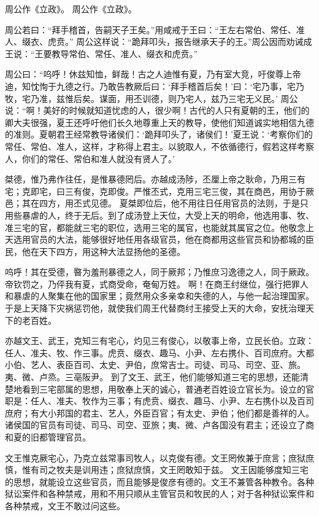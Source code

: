 \documentclass[a4paper,12pt,UTF8,twoside]{ctexbook}
\begin{document}
周公作《立政》。
周公作《立政》。

周公若曰：“拜手稽首，告嗣天子王矣。”用咸戒于王曰：“王左右常伯、常任、准人、缀衣、虎贲。”
周公这样说：“跪拜叩头，报告继承天子的王。”周公因而劝诫成王说：“王要教导常伯、常任、准人、缀衣和虎贲。”

周公曰：“呜呼！休兹知恤，鲜哉！古之人迪惟有夏，乃有室大竞，吁俊尊上帝迪，知忱恂于九德之行。乃敢告教厥后曰：‘拜手稽首后矣！’曰：‘宅乃事，宅乃牧，宅乃准，兹惟后矣。谋面，用丕训德，则乃宅人，兹乃三宅无义民。’
周公说：“啊！美好的时候就知道忧虑的人，很少啊！古代的人只有夏朝的王，他们的卿大夫很强，夏王还呼吁他们长久地尊重上天的教导，使他们知道诚实地相信九德的准则。夏朝君王经常教导诸侯们：‘跪拜叩头了，诸侯们！’夏王说：‘考察你们的常任、常伯、准人，这样，才称得上君主。以貌取人，不依循德行，假若这样考察人，你们的常任、常伯和准人就没有贤人了。’

桀德，惟乃弗作往任，是惟暴德罔后。亦越成汤陟，丕厘上帝之耿命，乃用三有宅；克即宅，曰三有俊，克即俊。严惟丕式，克用三宅三俊，其在商邑，用协于厥邑；其在四方，用丕式见德。
夏桀即位后，他不用往日任用官员的法则，于是只用些暴虐的人，终于无后。到了成汤登上天位，大受上天的明命，他选用事、牧、准三宅的官，都能就三宅的职位，选用三宅的属官，也能就其属官之位。他敬念上天选用官员的大法，能够很好地任用各级官员，他在商都用这些官员和协都城的臣民，他在天下四方，用这种大法显扬他的圣德。

呜呼！其在受德，暋为羞刑暴德之人，同于厥邦；乃惟庶习逸德之人，同于厥政。帝钦罚之，乃伻我有夏，式商受命，奄甸万姓。
啊！在商王纣继位，强行把罪人和暴虐的人聚集在他的国家里；竟然用众多亲幸和失德的人，与他一起治理国家。于是上天降下灾祸惩罚他，就使我们周王代替商纣王接受上天的大命，安抚治理天下的老百姓。

亦越文王、武王，克知三有宅心，灼见三有俊心，以敬事上帝，立民长伯。立政：任人、准夫、牧、作三事。虎贲、缀衣、趣马、小尹、左右携仆、百司庶府。大都小伯、艺人、表臣百司、太史、尹伯，庶常吉士。司徒、司马、司空、亚、旅。夷、微、卢烝。三亳阪尹。
到了文王、武王，他们能够知道三宅的思想，还能清楚地看到三宅部属的思想，用敬奉上天的诚心，普通老百姓设立官长为。设立的官职是：任人、准夫、牧作为三事；有虎贲、缀衣、趣马、小尹、左右携仆以及百司庶府；有大小邦国的君主、艺人，外臣百官；有太史、尹伯；他们都是善祥的人。诸侯国的官员有司徒、司马、司空、亚旅；夷、微、卢各国没有君主；还设立了商和夏的旧都管理官员。

文王惟克厥宅心，乃克立兹常事司牧人，以克俊有德。文王罔攸兼于庶言；庶狱庶慎，惟有司之牧夫是训用违；庶狱庶慎，文王罔敢知于兹。
文王因能够度知三宅的思想，就能设立这些官员，而且能够是俊彦有德的。文王不兼管各种教令。各种狱讼案件和各种禁戒，用和不用只顺从主管官员和牧民的人；对于各种狱讼案件和各种禁戒，文王不敢过问这些。
\end{document}

